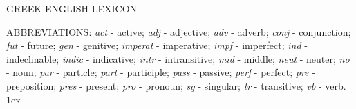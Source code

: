 \thispagestyle{plain}
\begin{center}
{\Huge GREEK-ENGLISH LEXICON}
\end{center}
\newpage

\pagestyle{fancy}
\cfoot{\gr{\thepage}}

{\small
\twocolumn
\noindent ABBREVIATIONS: {\em act} - active;
{\em adj} - adjective; {\em adv} - adverb; {\em conj} - conjunction; {\em fut} - future; {\em gen} - genitive; {\em imperat} - imperative; {\em impf} - imperfect;
{\em ind} - indeclinable; {\em indic} - indicative;
{\em intr} - intransitive; {\em mid} - middle; {\em neut} - neuter;
{\em no} - noun; 
{\em par} - particle; {\em part} - participle; {\em pass} - passive; {\em perf} - perfect;
{\em pre} - preposition; {\em pres} - present; {\em pro} - pronoun; {\em sg} - singular;
{\em tr} - transitive; {\em vb} - verb.
\baselineskip 1ex

}
